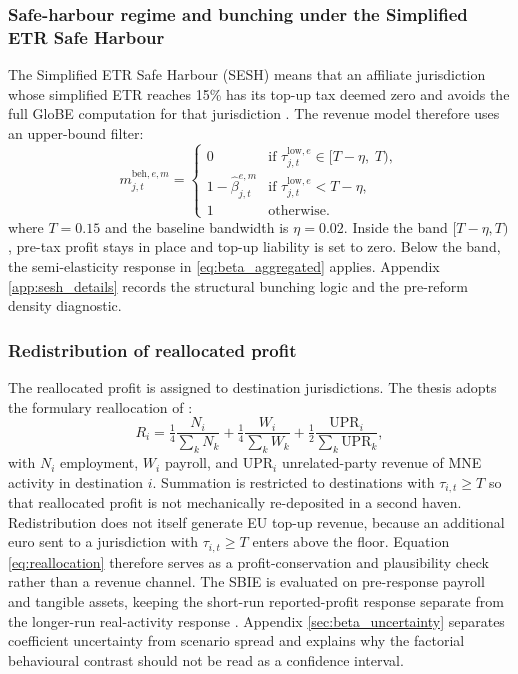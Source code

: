 \documentclass[11pt,a4paper]{article}
\begin{document}
\subsubsection{Safe-harbour regime and bunching under the Simplified ETR Safe Harbour}\label{sec:bunching}\label{sec:sesh}

The Simplified ETR Safe Harbour (SESH) means that an affiliate jurisdiction whose simplified ETR reaches 15\% has its top-up tax deemed zero and avoids the full GloBE computation for that jurisdiction \citep{oecd2026}. The revenue model therefore uses an upper-bound filter: 
\begin{equation}\label{eq:regime}
m_{j,t}^{\text{beh},e,m} = \begin{cases}
0 & \text{if } \tau_{j,t}^{\text{low},e} \in [T - \eta,\; T), \\[2pt]
1-\hat{\beta}_{j,t}^{e,m} & \text{if } \tau_{j,t}^{\text{low},e} < T - \eta, \\[2pt]
1 & \text{otherwise.}
\end{cases}
\end{equation}
where $T = 0.15$ and the baseline bandwidth is $\eta = 0.02$. Inside the band $[T-\eta,T)$, pre-tax profit stays in place and top-up liability is set to zero. Below the band, the semi-elasticity response in \eqref{eq:beta_aggregated} applies. Appendix \ref{app:sesh_details} records the structural bunching logic and the pre-reform density diagnostic.

\subsubsection{Redistribution of reallocated profit}\label{sec:reallocation}

The reallocated profit is assigned to destination jurisdictions. The thesis adopts the formulary reallocation of \citet{garcia-bernardo2024}:
\begin{equation}\label{eq:reallocation}
R_i = \tfrac{1}{4}\frac{N_i}{\sum_{k} N_k} + \tfrac{1}{4}\frac{W_i}{\sum_{k} W_k} + \tfrac{1}{2}\frac{\text{UPR}_i}{\sum_{k} \text{UPR}_k},
\end{equation}
with $N_i$ employment, $W_i$ payroll, and $\text{UPR}_i$ unrelated-party revenue of MNE activity in destination $i$. Summation is restricted to destinations with $\tau_{i,t} \geq T$ so that reallocated profit is not mechanically re-deposited in a second haven. Redistribution does not itself generate EU top-up revenue, because an additional euro sent to a jurisdiction with $\tau_{i,t}\ge T$ enters above the floor. Equation \eqref{eq:reallocation} therefore serves as a profit-conservation and plausibility check rather than a revenue channel. The SBIE is evaluated on pre-response payroll and tangible assets, keeping the short-run reported-profit response separate from the longer-run real-activity response \citep{bilicka2022,suarezserrato2018}. Appendix \ref{sec:beta_uncertainty} separates coefficient uncertainty from scenario spread and explains why the factorial behavioural contrast should not be read as a confidence interval.
\end{document}
